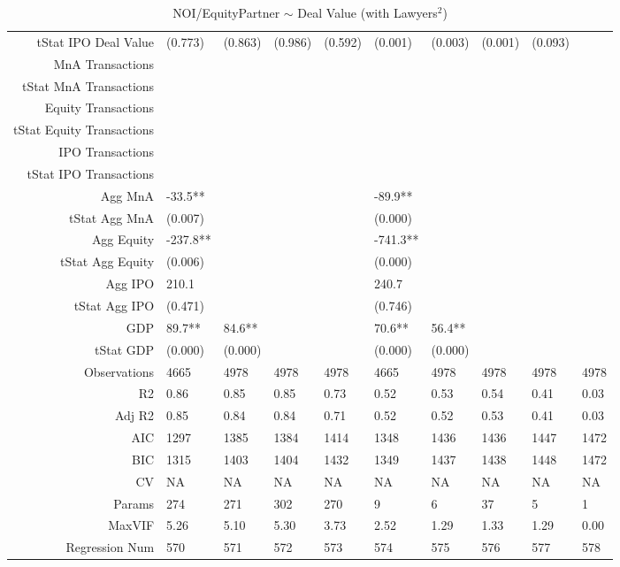\begin{table}[ht]
\begin{tabular}{rlllllllll}
  tStat IPO Deal Value & (0.773) & (0.863) & (0.986) & (0.592) & (0.001) & (0.003) & (0.001) & (0.093) &  \\ 
  MnA Transactions &  &  &  &  &  &  &  &  &  \\ 
  tStat MnA Transactions &  &  &  &  &  &  &  &  &  \\ 
  Equity Transactions &  &  &  &  &  &  &  &  &  \\ 
  tStat Equity Transactions &  &  &  &  &  &  &  &  &  \\ 
  IPO Transactions &  &  &  &  &  &  &  &  &  \\ 
  tStat IPO Transactions &  &  &  &  &  &  &  &  &  \\ 
  Agg MnA & -33.5** &  &  &  & -89.9** &  &  &  &  \\ 
  tStat Agg MnA & (0.007) &  &  &  & (0.000) &  &  &  &  \\ 
  Agg Equity & -237.8** &  &  &  & -741.3** &  &  &  &  \\ 
  tStat Agg Equity & (0.006) &  &  &  & (0.000) &  &  &  &  \\ 
  Agg IPO & 210.1 &  &  &  & 240.7 &  &  &  &  \\ 
  tStat Agg IPO & (0.471) &  &  &  & (0.746) &  &  &  &  \\ 
  GDP & 89.7** & 84.6** &  &  & 70.6** & 56.4** &  &  &  \\ 
  tStat GDP & (0.000) & (0.000) &  &  & (0.000) & (0.000) &  &  &  \\ 
  Observations & 4665 & 4978 & 4978 & 4978 & 4665 & 4978 & 4978 & 4978 & 4978 \\ 
  R2 & 0.86 & 0.85 & 0.85 & 0.73 & 0.52 & 0.53 & 0.54 & 0.41 & 0.03 \\ 
  Adj R2 & 0.85 & 0.84 & 0.84 & 0.71 & 0.52 & 0.52 & 0.53 & 0.41 & 0.03 \\ 
  AIC & 1297 & 1385 & 1384 & 1414 & 1348 & 1436 & 1436 & 1447 & 1472 \\ 
  BIC & 1315 & 1403 & 1404 & 1432 & 1349 & 1437 & 1438 & 1448 & 1472 \\ 
  CV & NA & NA & NA & NA & NA & NA & NA & NA & NA \\ 
  Params & 274 & 271 & 302 & 270 & 9 & 6 & 37 & 5 & 1 \\ 
  MaxVIF & 5.26 & 5.10 & 5.30 & 3.73 & 2.52 & 1.29 & 1.33 & 1.29 & 0.00 \\ 
  Regression Num & 570 & 571 & 572 & 573 & 574 & 575 & 576 & 577 & 578 \\ 
   \hline
\end{tabular}
\caption{NOI/EquityPartner $\sim$ Deal Value (with Lawyers$^2$)} 
\end{table}
